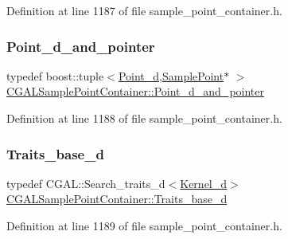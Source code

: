 Definition at line 1187 of file sample\+\_\+point\+\_\+container.\+h.

\mbox{\label{classCGALSamplePointContainer_a9fd65260284f24b79526a9db5fb55a3b}} 
\subsubsection{\texorpdfstring{Point\+\_\+d\+\_\+and\+\_\+pointer}{Point\_d\_and\_pointer}}
{\footnotesize\ttfamily typedef boost\+::tuple$<$\hyperlink{classCGALSamplePointContainer_a5cb9506ad72c5a21b91e626d5d8604ed}{Point\+\_\+d},\hyperlink{classSamplePoint}{Sample\+Point}$\ast$ $>$ \hyperlink{classCGALSamplePointContainer_a9fd65260284f24b79526a9db5fb55a3b}{C\+G\+A\+L\+Sample\+Point\+Container\+::\+Point\+\_\+d\+\_\+and\+\_\+pointer}\hspace{0.3cm}{\ttfamily [private]}}



Definition at line 1188 of file sample\+\_\+point\+\_\+container.\+h.

\mbox{\label{classCGALSamplePointContainer_ad22aa447b0cd9cfa0d92669b2d939dcc}} 
\subsubsection{\texorpdfstring{Traits\+\_\+base\+\_\+d}{Traits\_base\_d}}
{\footnotesize\ttfamily typedef C\+G\+A\+L\+::\+Search\+\_\+traits\+\_\+d$<$\hyperlink{classCGALSamplePointContainer_aa62fc873f6ad941cd31996baf64e669a}{Kernel\+\_\+d}$>$ \hyperlink{classCGALSamplePointContainer_ad22aa447b0cd9cfa0d92669b2d939dcc}{C\+G\+A\+L\+Sample\+Point\+Container\+::\+Traits\+\_\+base\+\_\+d}\hspace{0.3cm}{\ttfamily [private]}}



Definition at line 1189 of file sample\+\_\+point\+\_\+container.\+h.

